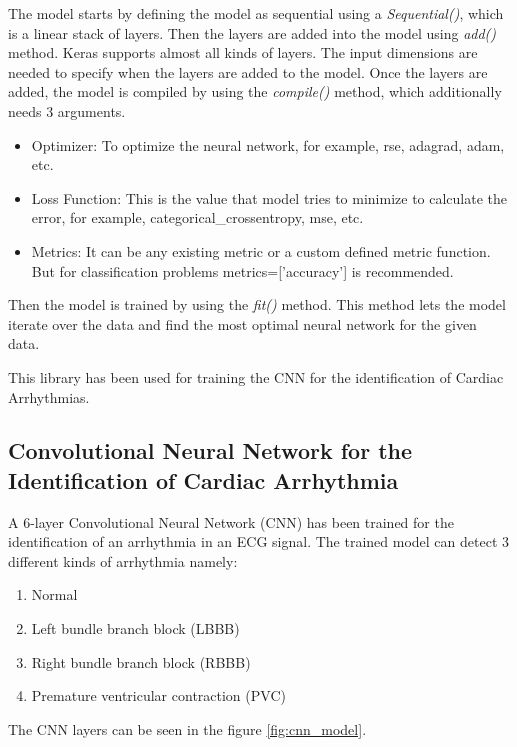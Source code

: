 The model starts by defining the model as sequential using a \textit{Sequential()}, which is a linear stack of layers. Then the layers are added into the model using \textit{add()} method. Keras supports almost all kinds of layers. The input dimensions are needed to specify when the layers are added to the model. Once the layers are added, the model is compiled by using the \textit{compile()} method, which additionally needs 3 arguments.

\begin{itemize}
	\item Optimizer: To optimize the neural network, for example, rse, adagrad, adam, etc.
	\item Loss Function: This is the value that model tries to minimize to calculate the error, for example, categorical\_crossentropy, mse, etc.
	\item Metrics: It can be any existing metric or a custom defined metric function. But for classification problems metrics=['accuracy'] is recommended.
\end{itemize}

Then the model is trained by using the \textit{fit()} method. This method lets the model iterate over the data and find the most optimal neural network for the given data.

This library has been used for training the CNN for the identification of Cardiac Arrhythmias.

\subsection{Convolutional Neural Network for the Identification of Cardiac Arrhythmia}
A 6-layer Convolutional Neural Network (CNN) has been trained for the identification of an arrhythmia in an ECG signal. The trained model can detect 3 different kinds of arrhythmia namely:

\begin{enumerate}
	\item Normal
	\item Left bundle branch block (LBBB)
	\item Right bundle branch block (RBBB)
	\item Premature ventricular contraction (PVC)
\end{enumerate}

The CNN layers can be seen in the figure \ref{fig:cnn_model}.


